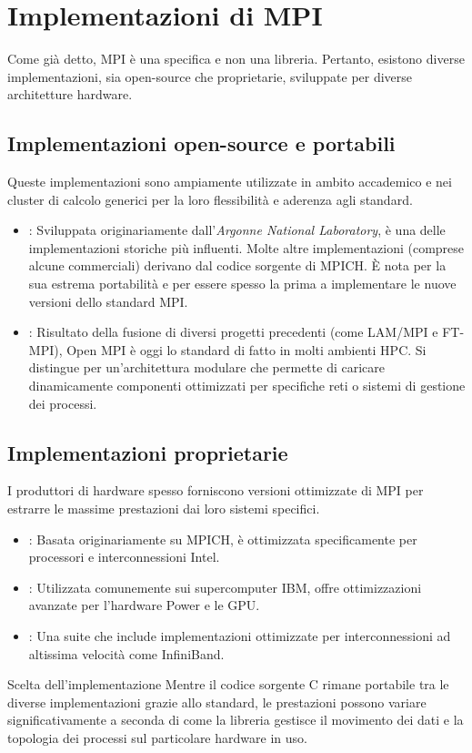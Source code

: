 \section{Implementazioni di MPI} 
Come già detto, MPI è una specifica e non una libreria.
Pertanto, esistono diverse implementazioni, sia open-source che proprietarie, sviluppate per diverse architetture hardware.

\subsection{Implementazioni open-source e portabili}
Queste implementazioni sono ampiamente utilizzate in ambito accademico e nei cluster di calcolo generici per la loro flessibilità e aderenza agli standard.

\begin{itemize}
    \item {}: Sviluppata originariamente dall'\textit{Argonne National Laboratory}, è una delle implementazioni storiche più influenti. Molte altre implementazioni (comprese alcune commerciali) derivano dal codice sorgente di MPICH. È nota per la sua estrema portabilità e per essere spesso la prima a implementare le nuove versioni dello standard MPI.
    \item {}: Risultato della fusione di diversi progetti precedenti (come LAM/MPI e FT-MPI), Open MPI è oggi lo standard di fatto in molti ambienti HPC. Si distingue per un'architettura modulare che permette di caricare dinamicamente componenti ottimizzati per specifiche reti o sistemi di gestione dei processi.
\end{itemize}

\subsection{Implementazioni proprietarie}
I produttori di hardware spesso forniscono versioni ottimizzate di MPI per estrarre le massime prestazioni dai loro sistemi specifici.

\begin{itemize}
    \item {}: Basata originariamente su MPICH, è ottimizzata specificamente per processori e interconnessioni Intel.
    \item {}: Utilizzata comunemente sui supercomputer IBM, offre ottimizzazioni avanzate per l'hardware Power e le GPU.
    \item {}: Una suite che include implementazioni ottimizzate per interconnessioni ad altissima velocità come InfiniBand.
\end{itemize}

\begin{observation}{Scelta dell'implementazione}
Mentre il codice sorgente C rimane portabile tra le diverse implementazioni grazie allo standard, le prestazioni possono variare significativamente a seconda di come la libreria gestisce il movimento dei dati e la topologia dei processi sul particolare hardware in uso.
\end{observation}
